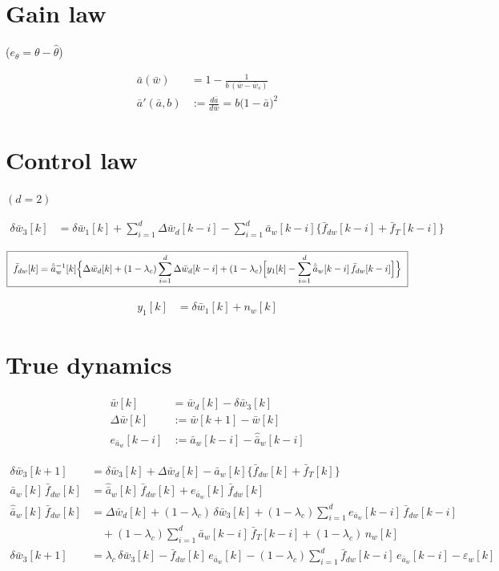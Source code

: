 \documentclass[11pt,a4paper,fontset=none]{ctexart}
\newcommand{\ba}{\bar{a}}
\newcommand{\bw}{\bar{w}}
\newcommand{\dW}{\Delta\bw}
\newcommand{\ap}{\ba'}
\newcommand{\ah}{\hat{\ba}_w}
\newcommand{\fd}{\bar f_{dw}}
\newcommand{\ea}{e_{\ba_w}}
\begin{document}
\section{Gain law}

($e_\theta = \theta - \hat\theta$)

\begin{align*}
\ba(\bw)    &= 1 - \frac{1}{b\,(\bw - \bw_s)} \\
\ap(\ba, b) &:= \frac{d\ba}{d\bw} = b\bigl(1-\ba\bigr)^{2}
\end{align*}

\section{Control law}

$(d = 2)$

\begin{align*}
\delta\bw_3[k] &= \delta\bw_1[k] + \sum_{i=1}^{d}\Delta\bw_d[k-i] - \sum_{i=1}^{d}\ba_w[k-i]\bigl\{\fd[k-i] + \bar f_T[k-i]\bigr\}
\end{align*}

\begin{align*}
\boxed{\ \fd[k] = \ah^{-1}[k]\Bigl\{\Delta\bw_d[k] + (1-\lambda_c)\sum_{i=1}^{d}\Delta\bw_d[k-i]
       + (1-\lambda_c)\Bigl[y_1[k] - \sum_{i=1}^{d}\ah[k-i]\,\fd[k-i]\Bigr]\Bigr\}\ }
\end{align*}

\begin{align*}
y_1[k] &= \delta\bw_1[k] + n_w[k]
\end{align*}

\section{True dynamics}

\begin{align*}
\bw[k]    &= \bw_d[k] - \delta\bw_3[k] \\
\dW[k]    &:= \bw[k+1] - \bw[k] \\
\ea[k-i]  &:= \ba_w[k-i] - \ah[k-i]
\end{align*}

\begin{align*}
\delta\bw_3[k+1] &= \delta\bw_3[k] + \Delta\bw_d[k] - \ba_w[k]\bigl\{\fd[k] + \bar f_T[k]\bigr\} \tag{1} \\[4pt]
\ba_w[k]\,\fd[k] &= \ah[k]\,\fd[k] + \ea[k]\,\fd[k] \tag{2} \\[4pt]
\ah[k]\,\fd[k]   &= \Delta\bw_d[k] + (1-\lambda_c)\,\delta\bw_3[k]
                    + (1-\lambda_c)\sum_{i=1}^{d}\ea[k-i]\,\fd[k-i] \\
                 &\quad + (1-\lambda_c)\sum_{i=1}^{d}\ba_w[k-i]\,\bar f_T[k-i] + (1-\lambda_c)\,n_w[k] \tag{3} \\[4pt]
\delta\bw_3[k+1] &= \lambda_c\,\delta\bw_3[k] - \fd[k]\,\ea[k]
                    - (1-\lambda_c)\sum_{i=1}^{d}\fd[k-i]\,\ea[k-i] - \varepsilon_w[k] \tag{4}
\end{align*}
\end{document}

